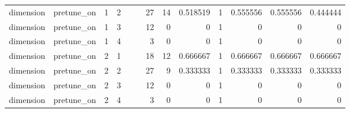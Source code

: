 \begin{table}[htbp]
\begin{tabular}{lrrrrrrrrrrrr}
dimension & pretune\_on & 1 & 2 &  &  & 27 & 14 & 0.518519 & 1 & 0.555556 & 0.555556 & 0.444444 \\
dimension & pretune\_on & 1 & 3 &  &  & 12 & 0 & 0 & 1 & 0 & 0 & 0 \\
dimension & pretune\_on & 1 & 4 &  &  & 3 & 0 & 0 & 1 & 0 & 0 & 0 \\
dimension & pretune\_on & 2 & 1 &  &  & 18 & 12 & 0.666667 & 1 & 0.666667 & 0.666667 & 0.666667 \\
dimension & pretune\_on & 2 & 2 &  &  & 27 & 9 & 0.333333 & 1 & 0.333333 & 0.333333 & 0.333333 \\
dimension & pretune\_on & 2 & 3 &  &  & 12 & 0 & 0 & 1 & 0 & 0 & 0 \\
dimension & pretune\_on & 2 & 4 &  &  & 3 & 0 & 0 & 1 & 0 & 0 & 0 \\
\bottomrule
\end{tabular}
\end{table}

